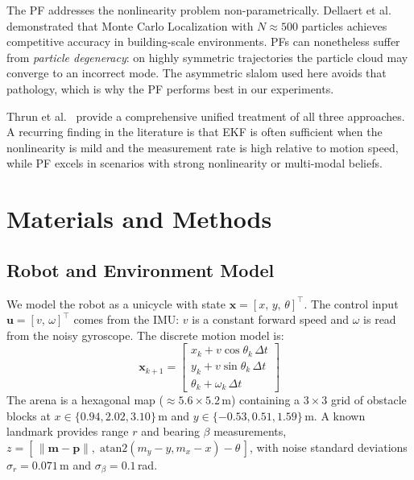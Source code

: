 \documentclass[conference]{IEEEtran}
\begin{document}
The PF addresses the nonlinearity problem non-parametrically.
Dellaert et al.~\cite{Dellaert1999Monte} demonstrated that Monte Carlo
Localization with $N\approx500$ particles achieves competitive accuracy in
building-scale environments.
PFs can nonetheless suffer from \emph{particle degeneracy}: on highly symmetric
trajectories the particle cloud may converge to an incorrect mode.
The asymmetric slalom used here avoids that pathology, which is why the PF
performs best in our experiments.

Thrun et al.~\cite{Thrun2005Probabilistic} provide a comprehensive unified
treatment of all three approaches.
A recurring finding in the literature is that EKF is often sufficient when the
nonlinearity is mild and the measurement rate is high relative to motion speed,
while PF excels in scenarios with strong nonlinearity or multi-modal beliefs.

\section{Materials and Methods}
\label{sec:methods}

\subsection{Robot and Environment Model}

We model the robot as a unicycle with state
$\mathbf{x} = [x,\, y,\, \theta]^\top$.
The control input $\mathbf{u} = [v,\, \omega]^\top$ comes from the IMU:
$v$ is a constant forward speed and $\omega$ is read from the noisy gyroscope.
The discrete motion model is:
\begin{equation}
  \mathbf{x}_{k+1} =
  \begin{bmatrix}
    x_k + v\cos\theta_k\,\Delta t \\
    y_k + v\sin\theta_k\,\Delta t \\
    \theta_k + \omega_k\,\Delta t
  \end{bmatrix}
\end{equation}
The arena is a hexagonal map ($\approx 5.6 \times 5.2$\,m) containing a
$3\times3$ grid of obstacle blocks at $x\in\{0.94, 2.02, 3.10\}$\,m and
$y\in\{-0.53, 0.51, 1.59\}$\,m.
A known landmark provides range $r$ and bearing $\beta$ measurements,
$z = [\,\lVert \mathbf{m}-\mathbf{p}\rVert,\; \mathrm{atan2}(m_y-y, m_x-x)-\theta\,]$,
with noise standard deviations $\sigma_r = 0.071$\,m and
$\sigma_\beta = 0.1$\,rad.
\end{document}
